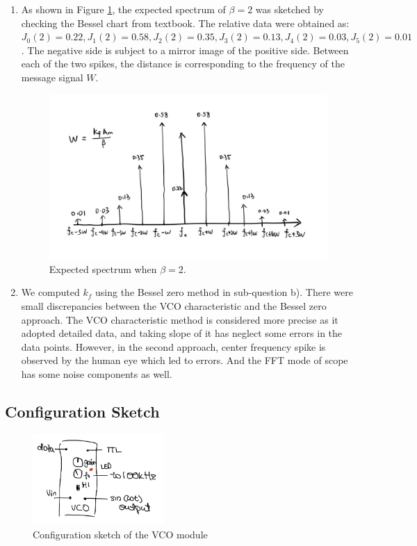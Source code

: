 \documentclass[11pt]{article}
\begin{document}
\begin{enumerate}[label=(\alph*)]
\item %
As shown in Figure \ref{fig:Q3cplot}, the expected spectrum of $\beta=2$ was sketched by checking the Bessel chart from textbook. The relative data were obtained as: $J_0(2)=0.22,J_1(2)=0.58,J_2(2)=0.35,J_3(2)=0.13,J_4(2)=0.03, J_5(2)=0.01$. The negative side is subject to a mirror image of the positive side. Between each of the two spikes, the distance is corresponding to the frequency of the message signal $W$. 
\begin{figure}[H]
    \centering
    \includegraphics[scale=0.25]{W3Q3c.jpg}
    \caption{Expected spectrum when $\beta=2$.}
    \label{fig:Q3cplot}
\end{figure}


\item %
We computed $k_f$ using the Bessel zero method in sub-question b). There were small discrepancies between the VCO characteristic and the Bessel zero approach. The VCO characteristic method is considered more precise as it adopted detailed data, and taking slope of it has neglect some errors in the data points. However, in the second approach, center frequency spike is observed by the human eye which led to errors. And the FFT mode of scope has some noise components as well. 
\end{enumerate}

\subsection*{Configuration Sketch}
\begin{figure}[H]
    \centering
    \includegraphics[width=5cm]{W3Q3Config.jpeg}
    \caption{Configuration sketch of the VCO module}
    \label{fig:W3Q3Config}
\end{figure}
\end{document}
